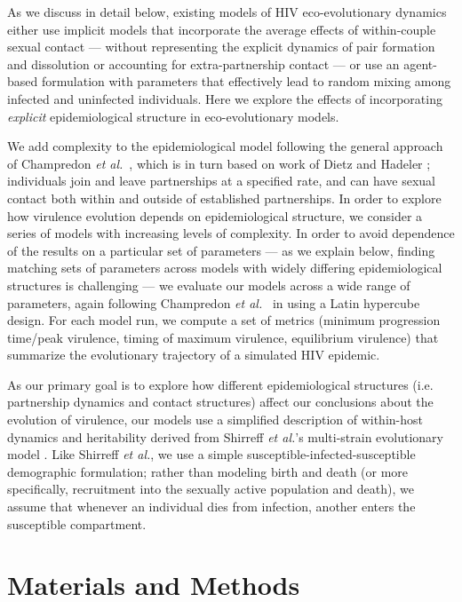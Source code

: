 \documentclass[10pt,letterpaper]{article}
\newcommand{\etal}{\textit{et al.}}
\begin{document}
As we discuss in detail below,
existing models of HIV eco-evolutionary dynamics either use implicit
models that incorporate the average effects of within-couple sexual
contact --- without representing the explicit dynamics of pair
formation and dissolution or accounting for extra-partnership contact
--- or use an agent-based formulation with parameters that effectively
lead to random mixing among infected and uninfected individuals. Here
we explore the effects of incorporating \emph{explicit}
epidemiological structure in eco-evolutionary models.

We add complexity to the epidemiological model following the general
approach of Champredon \etal\ \cite{champredon_hiv_2013},
which is in turn based on work of Dietz and Hadeler
\cite{dietz_epidemiological_1988}; individuals
join and leave partnerships at a specified rate, and can have sexual
contact both within and outside of established partnerships. In order
to explore how virulence evolution depends on epidemiological
structure, we consider a series of models with increasing levels of
complexity. In order to avoid dependence of the results on a
particular set of parameters --- as we explain below, finding matching
sets of parameters across models with widely differing epidemiological
structures is challenging --- we evaluate our models across a wide
range of parameters, again following Champredon
\etal\ \cite{champredon_hiv_2013} in using a Latin hypercube
design. For each model run, we compute a set of metrics (minimum
progression time/peak virulence, timing of maximum virulence, equilibrium virulence) that summarize the evolutionary trajectory of a simulated HIV epidemic.

As our primary goal is to explore how different epidemiological
structures (i.e. partnership dynamics and contact structures) affect
our conclusions about the evolution of virulence, our models use a
simplified description of within-host dynamics and heritability
derived from Shirreff \etal's multi-strain evolutionary model
\cite{shirreff_transmission_2011}. Like Shirreff \etal, we use a
simple susceptible-infected-susceptible demographic formulation;
rather than modeling birth and death (or more specifically,
recruitment into the sexually active population and death), we assume
that whenever an individual dies from infection, another enters the
susceptible compartment.

\section*{Materials and Methods}
\end{document}
